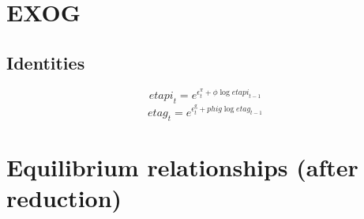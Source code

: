 \section{EXOG}

\subsection{Identities}

\begin{equation}
{e\!t\!a\!p\!i}_{t} = e^{\epsilon^{\pi}_{t} + {\phi} {\log{{e\!t\!a\!p\!i}_{t-1}}}}
\end{equation}
\begin{equation}
{e\!t\!a\!g}_{t} = e^{\epsilon^{\mathrm{g}}_{t} + {{p\!h\!i\!g}} {\log{{e\!t\!a\!g}_{t-1}}}}
\end{equation}




\section{Equilibrium relationships (after reduction)}

